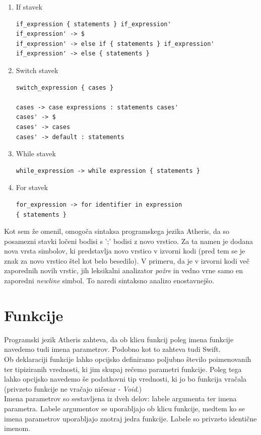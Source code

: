 \documentclass[a4paper, 12p]{book}
\begin{document}
\begin{enumerate}
	\item If stavek
\begin{lstlisting}[]
if_expression { statements } if_expression'
if_expression' -> $
if_expression' -> else if { statements } if_expression'
if_expression' -> else { statements }
\end{lstlisting}
	\item Switch stavek
\begin{lstlisting}[]
switch_expression { cases }

cases -> case expressions : statements cases'
cases' -> $
cases' -> cases
cases' -> default : statements
\end{lstlisting}
	\item While stavek
\begin{lstlisting}[]
while_expression -> while expression { statements }
\end{lstlisting}
	\item For stavek
\begin{lstlisting}[]
for_expression -> for identifier in expression 
{ statements }
\end{lstlisting}
\end{enumerate} 

Kot sem že omenil, omogoča sintaksa programskega jezika Atheris, da so posamezni stavki ločeni bodisi s ';' bodisi z novo vrstico. Za ta namen je dodana nova vrsta simbolov, ki predstavlja novo vrstico v izvorni kodi (pred tem se je znak za novo vrstico štel kot belo besedilo). V primeru, da je v izvorni kodi več zaporednih novih vrstic, jih leksikalni analizator \textit{požre} in vedno vrne samo en zaporedni \textit{newline} simbol. To naredi sintaksno analizo enostavnejšo. 

\section{Funkcije}

Programski jezik Atheris zahteva, da ob klicu funkcij poleg imena funkcije navedemo tudi imena parametrov. Podobno kot to zahteva tudi Swift. \\
\indent Ob deklaraciji funkcije lahko opcijsko definiramo poljubno število poimenovanih ter tipiziranih vrednosti, ki jim skupaj rečemo parametri funkcije. Poleg tega lahko opcijsko navedemo še podatkovni tip vrednosti, ki jo bo funkcija vračala (privzeto funkcije ne vračajo ničesar - \textit{Void}.) \\
\indent Imena parametrov so sestavljena iz dveh delov: labele argumenta ter imena parametra. Labele argumentov se uporabljajo ob klicu funkcije, medtem ko se imena parametrov uporabljajo znotraj jedra funkcije. Labele so privzeto identične imenom.
\end{document}
